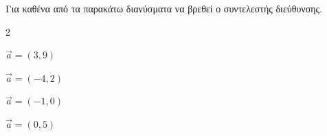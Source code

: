 \documentclass[11pt,a4paper,modern]{FFExercises}
\begin{document}
Για καθένα από τα παρακάτω διανύσματα να βρεθεί ο συντελεστής διεύθυνσης.
\begin{multicols}{2}
\begin{alist}
\item $ \vec{a}=(3,9) $
\item $ \vec{a}=(-4,2) $
\item $ \vec{a}=(-1,0) $
\item $ \vec{a}=(0,5) $
\end{alist}
\end{multicols}
\end{document}
